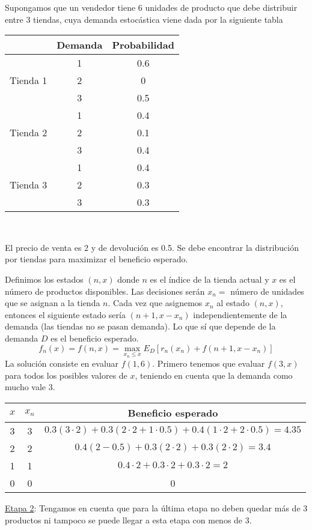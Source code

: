 \documentclass[MIOP.tex]{subfiles}
\begin{document}
\begin{ej}
Supongamos que un vendedor tiene 6 unidades de producto que debe distribuir entre 3 tiendas, cuya demanda estocástica viene dada por la siguiente tabla

\begin{tabular}{c|c|c|}
 & Demanda & Probabilidad\\
\hline
 	& 1 & 0.6\\
Tienda 1         & 2 & 0\\
         & 3 & 0.5\\
         \hline
 & 1 & 0.4      \\
 Tienda 2 & 2 & 0.1\\
          & 3 & 0.4\\
          \hline  
          & 1 & 0.4\\
  Tienda 3 & 2 & 0.3\\
  & 3 & 0.3\\
  \hline
\end{tabular}\

El precio de venta es 2 y de devolución es 0.5. Se debe encontrar la distribución por tiendas para maximizar el beneficio esperado.

Definimos los estados $(n,x)$ donde $n$ es el índice de la tienda actual y $x$ es el número de productos disponibles. Las decisiones serán $x_n=$ número de unidades que se asignan a la tienda $n$. Cada vez que asignemos $x_n$ al estado $(n,x)$, entonces el siguiente estado sería $(n+1,x-x_n)$ independientemente de la demanda (las tiendas no se pasan demanda). Lo que sí que depende de la demanda $D$ es el beneficio esperado.
$$f_n(x)=f(n,x)=\max_{x_n\leq x} E_D[r_n(x_n)+f(n+1,x-x_n)]$$
La solución consiste en evaluar $f(1,6)$. Primero tenemos que evaluar $f(3,x)$ para todos los posibles valores de $x$, teniendo en cuenta que la demanda como mucho vale 3. 

\begin{tabular}{|c|c|c|}
\hline
$x$ & $x_n$ & Beneficio esperado\\ 
\hline
3 &    3    & $0.3(3\cdot 2)+0.3(2\cdot 2 + 1\cdot 0.5) +0.4(1\cdot 2 + 2\cdot 0.5) = 4.35$ \\
2 &    2    & $0.4(2-0.5)+0.3(2\cdot 2)+0.3(2\cdot 2)=3.4$\\
1 &    1    & $0.4\cdot 2+ 0.3\cdot 2 + 0.3\cdot 2= 2$\\
0 &    0    & 0\\
\hline
\end{tabular}

\underline{Etapa 2}: Tengamos en cuenta que para la última etapa no deben quedar más de 3 productos ni tampoco se puede llegar a esta etapa con menos de 3.


\end{ej}
\end{document}
